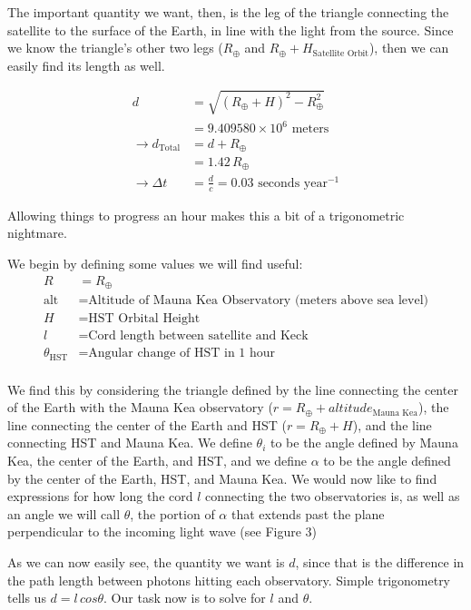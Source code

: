 \documentclass[12pt]{article}
\begin{document}
\begin{onehalfspacing}
\bigskip

The important quantity we want, then, is the leg of the triangle connecting the satellite to the surface of the Earth, in line with the light from the source. Since we know the triangle's other two legs ($R_{\oplus}$ and $R_{\oplus} + H_{\text{Satellite Orbit}}$), then we can easily find its length as well.

\begin{align*}
  d &= \sqrt{(R_{\oplus} + H)^2 - R_{\oplus}^2} \\
    &= 9.409580 \times 10^6 \text{ meters} \\
  \rightarrow d_{\text{Total}} &= d + R_{\oplus} \\
                   &= 1.42\, R_{\oplus} \\
  \rightarrow \Delta t &= \frac{d}{c} = 0.03 \text{ seconds year$^{-1}$}
\end{align*}



Allowing things to progress an hour makes this a bit of a trigonometric nightmare.

We begin by defining some values we will find useful:
\begin{align*}
  R &= R_{\oplus}\\
  \text{alt} &= \text{Altitude of Mauna Kea Observatory (meters above sea level)} \\
  H &= \text{HST Orbital Height} \\
  l &= \text{Cord length between satellite and Keck}\\
  \theta_{\text{HST}} &= \text{Angular change of HST in 1 hour} \\
\end{align*}


We find this by considering the triangle defined by the line connecting the center of the Earth with the Mauna Kea observatory ($r = R_{\oplus} + altitude_{\text{Mauna Kea}}$), the line connecting the center of the Earth and HST ($r = R_{\oplus} + H$), and the line connecting HST and Mauna Kea. We define $\theta_i$ to be the angle defined by Mauna Kea, the center of the Earth, and HST, and we define $\alpha$ to be the angle defined by the center of the Earth, HST, and Mauna Kea. We would now like to find expressions for how long the cord $l$ connecting the two observatories is, as well as an angle we will call $\theta$, the portion of $\alpha$ that extends past the plane perpendicular to the incoming light wave (see Figure 3)


As we can now easily see, the quantity we want is $d$, since that is the difference in the path length between photons hitting each observatory. Simple trigonometry tells us $d = l \, cos{\theta}$. Our task now is to solve for $l$ and $\theta$.


\end{onehalfspacing}
\end{document}
